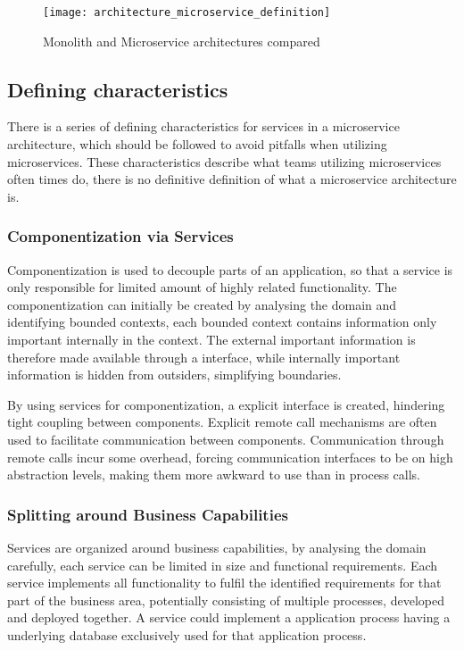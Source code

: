 \begin{figure}[!htb]
  \texttt{[image: architecture\_microservice\_definition]}  
  \caption{Monolith and Microservice architectures compared}
  \label{fig:architecture_microservice_definition}
\end{figure}

\subsection{Defining characteristics}
There is a series of defining characteristics for services in a microservice architecture, which should be followed to avoid pitfalls when utilizing microservices. These characteristics describe what teams utilizing microservices often times do, there is no definitive definition of what a microservice architecture is.

\subsubsection*{Componentization via Services}
Componentization is used to decouple parts of an application, so that a service is only responsible for limited amount of highly related functionality\cite{morgantini2013whatAreMicroServices}. The componentization can initially be created by analysing the domain and identifying bounded contexts\cite[p.~31]{newman2015microservices}, each bounded context contains information only important internally in the context. 
The external important information is therefore made available through a interface, while internally important information is hidden from outsiders, simplifying boundaries.

By using services for componentization, a explicit interface is created, hindering tight coupling between components. Explicit remote call mechanisms are often used to facilitate communication between components. Communication through remote calls incur some overhead, forcing communication interfaces to be on high abstraction levels, making them more awkward to use than in process calls.

\subsubsection*{Splitting around Business Capabilities}
Services are organized around business capabilities, by analysing the domain carefully, each service can be limited in size and functional requirements. Each service implements all functionality to fulfil the identified requirements for that part of the business area, potentially consisting of multiple processes, developed and deployed together. A service could implement a application process having a underlying database exclusively used for that application process\cite{fowler2014microservices}.

